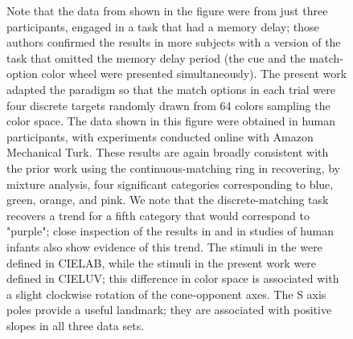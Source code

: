 \documentclass[9pt,biorxiv,lineno,onehalfspacing]{lapreprint}
\begin{document}
\begin{figure}
\begin{fullwidth}
{    Note that the data from \citep{bae_why_2015} shown in the figure were from just three participants, engaged in a task that had a memory delay; those authors confirmed the results in more subjects with a version of the task that omitted the memory delay period (the cue and the match-option color wheel were presented simultaneously). The present work adapted the paradigm so that the match options in each trial were four discrete targets randomly drawn from 64 colors sampling the color space. The data shown in this figure were obtained in human participants, with experiments conducted online with Amazon Mechanical Turk. These results are again broadly consistent with the prior work using the continuous-matching ring in recovering, by mixture analysis, four significant categories corresponding to blue, green, orange, and pink. We note that the discrete-matching task recovers a trend for a fifth category that would correspond to "purple"; close inspection of the results in \citep{bae_why_2015, panichello_error-correcting_2019} and in studies of human infants \citep{skelton_biological_2017} also show evidence of this trend. The stimuli in the \citep{bae_why_2015, panichello_error-correcting_2019} were defined in CIELAB, while the stimuli in the present work were defined in CIELUV; this difference in color space is associated with a slight clockwise rotation of the cone-opponent axes. The S axis poles provide a useful landmark; they are associated with positive slopes in all three data sets.
    } 
    \label{fig:Human}
    \end{fullwidth}
\end{figure}
\end{document}

